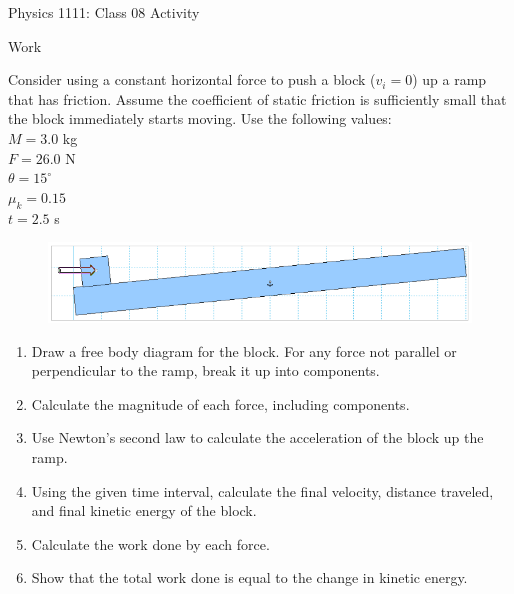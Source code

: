 \documentclass[12pt]{article}
\begin{document}
{\centering
\large Physics 1111: Class 08 Activity \par
\large Work \par
}
\hfill \break \vspace{-4mm}

Consider using a constant horizontal force to push a block ($v_i = 0$) up a ramp that has friction.
Assume the coefficient of static friction is sufficiently small that the block immediately starts moving.
Use the following values: \\
$M = 3.0$ kg \\
$F = 26.0$ N \\
$\theta = 15^\circ$ \\
$\mu_k = 0.15$ \\
$t = 2.5$ s
%
\begin{figure}[H]
\includegraphics[scale=0.70]{fig.png}
\end{figure}
%
\begin{enumerate}
\item Draw a free body diagram for the block. For any force not parallel or perpendicular to the ramp, break it up into components.
\item Calculate the magnitude of each force, including components.
\item Use Newton's second law to calculate the acceleration of the block up the ramp.
\item Using the given time interval, calculate the final velocity, distance traveled, and final kinetic energy of the block.
\item Calculate the work done by each force.
\item Show that the total work done is equal to the change in kinetic energy.
\end{enumerate}
\end{document}
